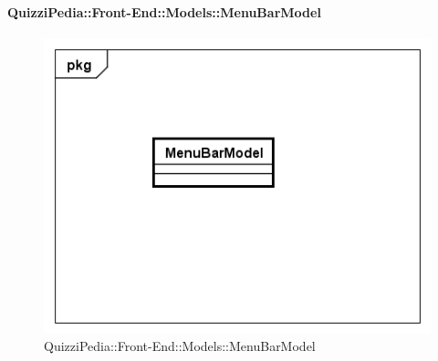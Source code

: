 \paragraph{QuizziPedia::Front-End::Models::MenuBarModel}
		
		\label{QuizziPedia::Front-End::Models::MenuBarModel}
		
		\begin{figure}[ht]
			\centering
			\includegraphics[scale=0.5,keepaspectratio]{UML/Classi/Front-End/QuizziPedia_Front-end_Models_MenuBarModel.png}
			\caption{QuizziPedia::Front-End::Models::MenuBarModel}
		\end{figure} \FloatBarrier
		
